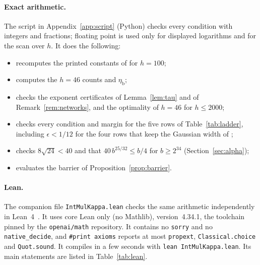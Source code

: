 \documentclass[11pt]{article}
\numberwithin{equation}{section}
\numberwithin{table}{section}
\theoremstyle{remark}
\newcommand{\OAI}{\cite{OAI}}
\newcommand{\etab}{\eta_{\mathrm b}}
\newcommand{\lean}[1]{\texttt{#1}}
\begin{document}
\paragraph{Exact arithmetic.} The script in Appendix~\ref{app:script}
(Python) checks every condition with integers and fractions; floating
point is used only for displayed logarithms and for the scan over $h$.
It does the following:
\begin{itemize}
\item recomputes the printed constants of \OAI{} for $h=100$;
\item computes the $h=46$ counts and $\etab$;
\item checks the exponent certificates of Lemma~\ref{lem:tau} and of
Remark~\ref{rem:networks}, and the optimality of $h=46$ for $h\le2000$;
\item checks every condition and margin for the five rows of
Table~\ref{tab:ladder}, including $\epsilon<1/12$ for the four rows that
keep the Gaussian width of \OAI;
\item checks $8\sqrt{24}<40$ and that $40\,b^{25/32}\le b/4$ for
$b\ge2^{34}$ (Section~\ref{sec:alpha});
\item evaluates the barrier of Proposition~\ref{prop:barrier}.
\end{itemize}

\paragraph{Lean.} The companion file \lean{IntMulKappa.lean} checks the
same arithmetic independently in Lean~4~\cite{Lean}. It uses core Lean only (no
Mathlib), version~4.34.1, the toolchain pinned by the
\texttt{openai/math} repository. It contains no \lean{sorry} and no
\lean{native\_decide}, and \lean{\#print axioms} reports at most
\lean{propext}, \lean{Classical.choice} and \lean{Quot.sound}. It
compiles in a few seconds with \lean{lean IntMulKappa.lean}. Its
main statements are listed in Table~\ref{tab:lean}.
\end{document}
